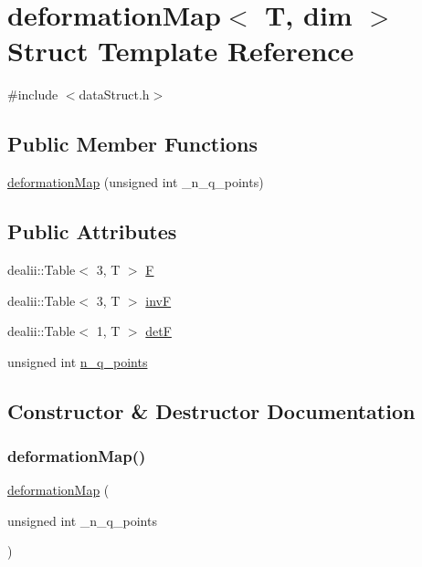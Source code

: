 \section{deformation\+Map$<$ T, dim $>$ Struct Template Reference}
\label{structdeformation_map}


{\ttfamily \#include $<$data\+Struct.\+h$>$}

\subsection*{Public Member Functions}
\begin{DoxyCompactItemize}
\item 
\mbox{\hyperlink{structdeformation_map_a3ce85c3a09b45f207030b97eed6c5e4c}{deformation\+Map}} (unsigned int \+\_\+n\+\_\+q\+\_\+points)
\end{DoxyCompactItemize}
\subsection*{Public Attributes}
\begin{DoxyCompactItemize}
\item 
dealii\+::\+Table$<$ 3, T $>$ \mbox{\hyperlink{structdeformation_map_a7934bed7ba72b5e4a3af1fd8a4e14198}{F}}
\item 
dealii\+::\+Table$<$ 3, T $>$ \mbox{\hyperlink{structdeformation_map_ae40deb9e4616ec6d0b77519e56646ce0}{invF}}
\item 
dealii\+::\+Table$<$ 1, T $>$ \mbox{\hyperlink{structdeformation_map_aa1ff2dc8fb6f4f6e9125ca026505a977}{detF}}
\item 
unsigned int \mbox{\hyperlink{structdeformation_map_a75df8197cf561419d8ead67373abeafd}{n\+\_\+q\+\_\+points}}
\end{DoxyCompactItemize}


\subsection{Constructor \& Destructor Documentation}
\mbox{\label{structdeformation_map_a3ce85c3a09b45f207030b97eed6c5e4c}} 
\subsubsection{\texorpdfstring{deformation\+Map()}{deformationMap()}}
{\footnotesize\ttfamily \mbox{\hyperlink{structdeformation_map}{deformation\+Map}} (\begin{DoxyParamCaption}\item[{unsigned int}]{\+\_\+n\+\_\+q\+\_\+points }\end{DoxyParamCaption})\hspace{0.3cm}{\ttfamily [inline]}}



